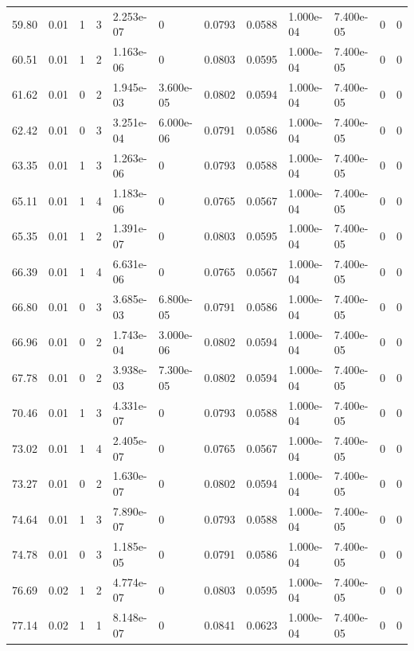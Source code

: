 \documentclass[preview]{standalone}
\begin{document}
{{{\begin{tabular}{L{1.2cm}C{1.2cm} C{0.3cm}C{0.5cm} C{1.4cm}C{1.4cm} C{1.4cm}C{1.4cm} C{1.6cm}C{1.6cm} C{1.6cm}C{1.6cm}}
  59.80  &  0.01  & 1     &  3 &  2.253e-07  & 0  &  0.0793&   0.0588& 1.000e-04 & 7.400e-05   &  0 & 0  \\ 
  60.51  &  0.01  & 1     &  2 &  1.163e-06  & 0  &  0.0803&   0.0595& 1.000e-04 & 7.400e-05   &  0 & 0  \\ 
  61.62  &  0.01  & 0     &  2 &  1.945e-03  & 3.600e-05  &  0.0802&   0.0594& 1.000e-04 & 7.400e-05   &  0 & 0  \\ 
  62.42  &  0.01  & 0     &  3 &  3.251e-04  & 6.000e-06  &  0.0791&   0.0586& 1.000e-04 & 7.400e-05   &  0 & 0  \\ 
  63.35  &  0.01  & 1     &  3 &  1.263e-06  & 0  &  0.0793&   0.0588& 1.000e-04 & 7.400e-05   &  0 & 0  \\ 
  65.11  &  0.01  & 1     &  4 &  1.183e-06  & 0  &  0.0765&   0.0567& 1.000e-04 & 7.400e-05   &  0 & 0  \\ 
  65.35  &  0.01  & 1     &  2 &  1.391e-07  & 0  &  0.0803&   0.0595& 1.000e-04 & 7.400e-05   &  0 & 0  \\ 
  66.39  &  0.01  & 1     &  4 &  6.631e-06  & 0  &  0.0765&   0.0567& 1.000e-04 & 7.400e-05   &  0 & 0  \\ 
  66.80  &  0.01  & 0     &  3 &  3.685e-03  & 6.800e-05  &  0.0791&   0.0586& 1.000e-04 & 7.400e-05   &  0 & 0  \\ 
  66.96  &  0.01  & 0     &  2 &  1.743e-04  & 3.000e-06  &  0.0802&   0.0594& 1.000e-04 & 7.400e-05   &  0 & 0  \\ 
  67.78  &  0.01  & 0     &  2 &  3.938e-03  & 7.300e-05  &  0.0802&   0.0594& 1.000e-04 & 7.400e-05   &  0 & 0  \\ 
  70.46  &  0.01  & 1     &  3 &  4.331e-07  & 0  &  0.0793&   0.0588& 1.000e-04 & 7.400e-05   &  0 & 0  \\ 
  73.02  &  0.01  & 1     &  4 &  2.405e-07  & 0  &  0.0765&   0.0567& 1.000e-04 & 7.400e-05   &  0 & 0  \\ 
  73.27  &  0.01  & 0     &  2 &  1.630e-07  & 0  &  0.0802&   0.0594& 1.000e-04 & 7.400e-05   &  0 & 0  \\ 
  74.64  &  0.01  & 1     &  3 &  7.890e-07  & 0  &  0.0793&   0.0588& 1.000e-04 & 7.400e-05   &  0 & 0  \\ 
  74.78  &  0.01  & 0     &  3 &  1.185e-05  & 0  &  0.0791&   0.0586& 1.000e-04 & 7.400e-05   &  0 & 0  \\ 
  76.69  &  0.02  & 1     &  2 &  4.774e-07  & 0  &  0.0803&   0.0595& 1.000e-04 & 7.400e-05   &  0 & 0  \\ 
  77.14  &  0.02  & 1     &  1 &  8.148e-07  & 0  &  0.0841&   0.0623& 1.000e-04 & 7.400e-05   &  0 & 0  \\ 

\end{tabular}}}}
\end{document}
